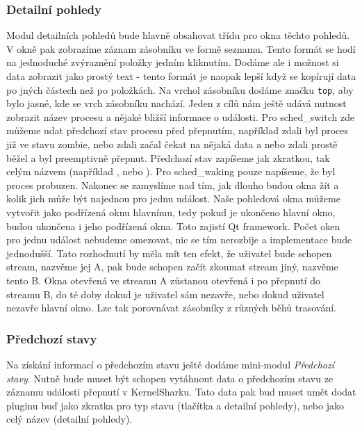 \subsubsection{Detailní pohledy}
Modul detailních pohledů bude hlavně obsahovat třídu pro okna těchto pohledů. V okně pak zobrazíme záznam zásobníku ve formě seznamu. Tento formát se hodí na jednoduché zvýraznění položky jedním kliknutím. Dodáme ale i možnost si data zobrazit jako prostý text - tento formát je naopak lepší když se kopírují data po jných částech než po položkách. Na vrchol zásobníku dodáme značku \texttt{top}, aby bylo jasné, kde se vrch zásobníku nachází. Jeden z cílů nám ještě udává nutnost zobrazit název procesu a nějaké bližší informace o události. Pro sched\_switch zde můžeme udat předchozí stav procesu před přepnutím, například zdali byl proces již ve stavu zombie, nebo zdali začal čekat na nějaká data a nebo zdali prostě běžel a byl preemptivně přepnut. Předchozí stav zapíšeme jak zkratkou, tak celým názvem (například , nebo ). Pro sched\_waking pouze napíšeme, že byl proces probuzen. Nakonec se zamyslíme nad tím, jak dlouho budou okna žít a kolik jich může být najednou pro jednu událost. Naše pohledová okna můžeme vytvořit jako podřízená oknu hlavnímu, tedy pokud je ukončeno hlavní okno, budou ukončena i jeho podřízená okna. Toto zajistí Qt framework. Počet oken pro jednu událost nebudeme omezovat, nic se tím nerozbije a implementace bude jednodušší. Tato rozhodnutí by měla mít ten efekt, že uživatel bude schopen stream, nazvěme jej A, pak bude schopen začít zkoumat stream jiný, nazvěme tento B. Okna otevřená ve streamu A zůstanou otevřená i po přepnutí do streamu B, do té doby dokud je uživatel sám nezavře, nebo dokud uživatel nezavře hlavní okno. Lze tak porovnávat zásobníky z různých běhů trasování.

\subsubsection{Předchozí stavy}
Na získání informací o předchozím stavu ještě dodáme mini-modul \emph{Předchozí stavy}. Nutně bude muset být schopen vytáhnout data o předchozím stavu ze záznamu události přepnutí v KernelSharku. Tato data pak bud muset umět dodat pluginu buď jako zkratka pro typ stavu (tlačítka a detailní pohledy), nebo jako celý název (detailní pohledy).

